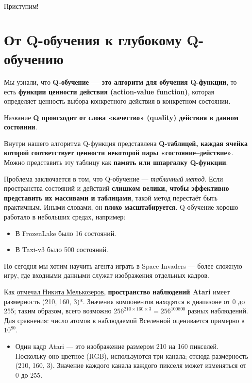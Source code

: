 \documentclass[11pt,a4paper]{article}
\begin{document}
Приступим!

\section{От Q-обучения к глубокому Q-обучению}\label{from-q-learning-to-deep-q-learning}

Мы узнали, что \textbf{Q-обучение --- это алгоритм для обучения Q-функции}, то есть \textbf{функции ценности действия (action-value function)}, которая определяет ценность выбора конкретного действия в конкретном состоянии.


Название \textbf{Q происходит от слова «качество» (quality) действия в данном состоянии}.

Внутри нашего алгоритма Q-функция представлена \textbf{Q-таблицей, каждая ячейка которой соответствует ценности некоторой пары «состояние--действие»}. Можно представить эту таблицу как \textbf{память или шпаргалку Q-функции}.

Проблема заключается в том, что Q-обучение --- \emph{табличный метод}. Если пространства состояний и действий \textbf{слишком велики, чтобы эффективно представить их массивами и таблицами}, такой метод перестаёт быть практичным. Иными словами, он \textbf{плохо масштабируется}. Q-обучение хорошо работало в небольших средах, например:

\begin{itemize}
\tightlist
\item
В FrozenLake было 16 состояний.
\item
В Taxi-v3 было 500 состояний.
\end{itemize}

Но сегодня мы хотим научить агента играть в Space Invaders --- более сложную игру, где входными данными служат изображения отдельных кадров.

Как \href{https://twitter.com/meln1k}{отмечал Никита Мелькозеров}, \textbf{пространство наблюдений Atari} имеет размерность (210, 160, 3)*. Значения компонентов находятся в диапазоне от 0 до 255; таким образом, всего возможно \(256^{210 \times 160 \times 3} = 256^{100800}\) разных наблюдений. Для сравнения: число атомов в наблюдаемой Вселенной оценивается примерно в \(10^{80}\).

\begin{itemize}
\tightlist
\item
Один кадр Atari --- это изображение размером 210 на 160 пикселей. Поскольку оно цветное (RGB), используются три канала; отсюда размерность (210, 160, 3). Значение каждого канала каждого пикселя может изменяться от 0 до 255.
\end{itemize}
\end{document}
